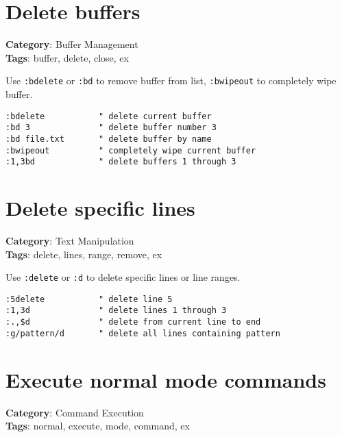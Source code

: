 {{{{{{\section{Delete buffers}

\textbf{Category}: Buffer Management\\ \textbf{Tags}: buffer, delete, close, ex
\vspace{0.5cm}

Use {\footnotesize \Verb§:bdelete§} or {\footnotesize \Verb§:bd§} to remove buffer from list, {\footnotesize \Verb§:bwipeout§} to completely wipe buffer.

\begin{Exa*}{}
\begin{Verbatim}[fontsize=\footnotesize, breaklines, breakanywhere]
:bdelete           " delete current buffer
:bd 3              " delete buffer number 3
:bd file.txt       " delete buffer by name
:bwipeout          " completely wipe current buffer
:1,3bd             " delete buffers 1 through 3
\end{Verbatim}
\end{Exa*}

\section{Delete specific lines}

\textbf{Category}: Text Manipulation\\ \textbf{Tags}: delete, lines, range, remove, ex
\vspace{0.5cm}

Use {\footnotesize \Verb§:delete§} or {\footnotesize \Verb§:d§} to delete specific lines or line ranges.

\begin{Exa*}{}
\begin{Verbatim}[fontsize=\footnotesize, breaklines, breakanywhere]
:5delete           " delete line 5
:1,3d              " delete lines 1 through 3
:.,$d              " delete from current line to end
:g/pattern/d       " delete all lines containing pattern
\end{Verbatim}
\end{Exa*}

\section{Execute normal mode commands}

\textbf{Category}: Command Execution\\ \textbf{Tags}: normal, execute, mode, command, ex
\vspace{0.5cm}

}}}}}}
